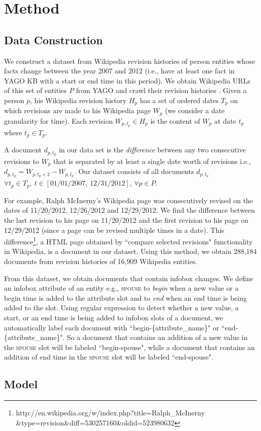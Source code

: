 \section{Method} \label{sec:method}

\subsection{Data Construction}
We construct a dataset from Wikipedia revision histories of person entities whose facts change between the year 2007 and 2012 (i.e., have at least one fact in YAGO KB with a start or end time in this period). We obtain Wikipedia URLs of this set of entities $P$ from YAGO and crawl their revision histories%
. Given a person $p$, his Wikipedia revision history $H_p$ has a set of ordered dates $T_p$ on which revisions are made to his Wikipedia page $W_p$ (we consider a date granularity for time). Each revision $W_{p, t_p} \in H_p$ is the content of $W_p$ at date $t_p$ where $t_p \in T_p$. 

A document $d_{p, t_p}$ in our data set is the \textit{difference} between any two consecutive revisions to $W_p$ that is separated by at least a single date worth of revisions i.e., $d_{p, t_p} = W_{p, t_p+2} - W_{p, t_p}$. Our dataset consists of all documents $d_{p, t_p}$ $\forall t_p \in T_p,\ t \in [01/01/2007,\ 12/31/2012]$, $\forall p \in P$. 

For example, Ralph McInerny's Wikipedia page was consecutively revised on the dates of 11/20/2012, 12/26/2012 and 12/29/2012. We find the difference between the last revision to his page on 11/20/2012 and the first revision to his page on 12/29/2012 (since a page can be revised multiple times in a date). This difference\footnote[2]{http://en.wikipedia.org/w/index.php?title=Ralph\_McInerny \&type=revision\&diff=530257160\&oldid=523980632}, a HTML page obtained by ``compare selected revisions"  functionality in Wikipedia, is a document in our dataset. Using this method, we obtain 288,184 documents from revision histories of 16,909 Wikipedia entities. 

From this dataset, we obtain documents that contain infobox changes. We define an infobox attribute of an entity e.g., \textsc{spouse} to \textit{begin} when a new value or a begin time is added to the attribute slot and to \textit{end} when an end time is being added to the slot. Using regular expression to detect whether a new value, a start, or an end time is being added to infobox slots of a document, we automatically label each document with ``begin-\{attribute\_name\}" or ``end-\{attribute\_name\}". So a document that contains an addition of a new value in the \textsc{spouse} slot will be labeled ``begin-spouse", while a document that contains an addition of end time in the \textsc{spouse} slot will be labeled ``end-spouse". 

\subsection{Model}


